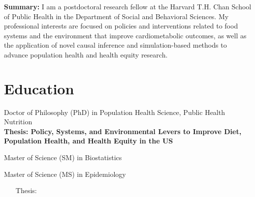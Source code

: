 \documentclass{cv_style}
\begin{document}
\begin{center}
\end{center}


\begin{adjustwidth}{0.7cm}{0.7cm} \parskip 8pt \begin{small} \textbf{Summary:} I am a postdoctoral research fellow at the Harvard T.H. Chan School of Public Health in the Department of Social and Behavioral Sciences. My professional interests are focused on policies and interventions related to food systems and the environment that improve cardiometabolic outcomes, as well as the application of novel causal inference and simulation-based methods to advance population health and health equity research.  
\end{small}
\end{adjustwidth}


\parskip -5pt 
\section{Education}
\parskip -5pt
\parskip -4pt \noindent Doctor of Philosophy (PhD) in Population Health Science, Public Health Nutrition \\
\textbf{Thesis: Policy, Systems, and Environmental Levers to Improve Diet, Population Health, and Health Equity in the US}\\

\vspace{-1em}


\parskip -4pt \noindent Master of Science (SM) in Biostatistics

\parskip -4pt Master of Science (MS) in Epidemiology \\
    \vspace{-1em}
    \begingroup
    \addtolength{\leftmargini}{3em} \begin{itemize}
        \item[\hspace{1em}Thesis:] 
    \end{itemize}
    \endgroup
\parskip -8pt  
\end{document}
